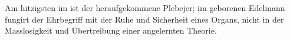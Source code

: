 Am hitzigsten im  ist der heraufgekommene Plebejer; im geborenen Edelmann fungirt der Ehrbegriff mit der Ruhe und Sicherheit eines Organs, nicht in der Masslosigkeit und Übertreibung einer angelernten Theorie.
\par

